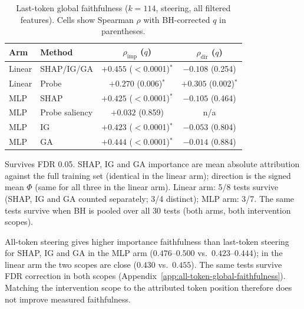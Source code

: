 \begin{table}[H]
    \centering
    \small
    \setlength{\tabcolsep}{5pt}
    \caption{Last-token global faithfulness ($k=114$, steering, all filtered features). Cells show Spearman $\rho$ with BH-corrected $q$ in parentheses.}
    \label{tab:all-selection-faithfulness-last}
    \begin{threeparttable}
    \begin{tabular}{llcc}
        \toprule
        Arm & Method & $\rho_\text{imp}$ ($q$) & $\rho_\text{dir}$ ($q$) \\
        \midrule
        Linear & SHAP/IG/GA     & $+0.455$ ($<$0.0001)$^*$ & $-0.108$ (0.254) \\
        Linear & Probe          & $+0.270$ (0.006)$^*$ & $+0.305$ (0.002)$^*$ \\
        \midrule
        MLP    & SHAP           & $+0.425$ ($<$0.0001)$^*$ & $-0.105$ (0.464) \\
        MLP    & Probe saliency & $+0.032$ (0.859)     & n/a \\
        MLP    & IG             & $+0.423$ ($<$0.0001)$^*$ & $-0.053$ (0.804) \\
        MLP    & GA             & $+0.444$ ($<$0.0001)$^*$ & $-0.014$ (0.884) \\
        \bottomrule
    \end{tabular}
    \begin{tablenotes}\footnotesize
        \item[$^*$] Survives FDR 0.05. SHAP, IG and GA importance are mean absolute attribution against the full training set (identical in the linear arm); direction is the signed mean $\Phi$ (same for all three in the linear arm). Linear arm: 5/8 tests survive (SHAP, IG and GA counted separately; 3/4 distinct); MLP arm: 3/7. The same tests survive when BH is pooled over all 30 tests (both arms, both intervention scopes).
    \end{tablenotes}
    \end{threeparttable}
\end{table}
All-token steering gives higher importance faithfulness than last-token steering for SHAP, IG and GA in the MLP arm ($0.476$--$0.500$ vs.\ $0.423$--$0.444$); in the linear arm the two scopes are close ($0.430$ vs.\ $0.455$). The same tests survive FDR correction in both scopes (Appendix~\ref{app:all-token-global-faithfulness}). Matching the intervention scope to the attributed token position therefore does not improve measured faithfulness.

